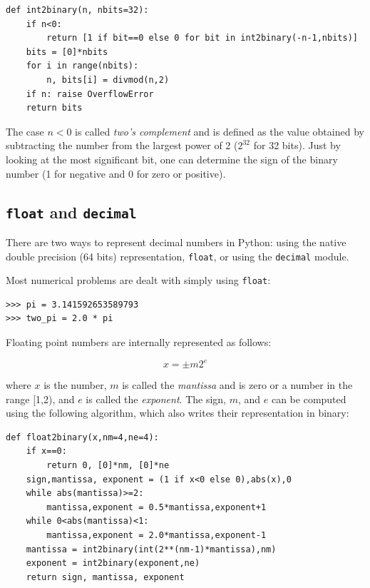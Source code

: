 \documentclass[justified,sixbynine]{tufte-book}
\def\ft{\small\tt}
\theoremstyle{plain}%
\theoremstyle{definition}
\theoremstyle{remark}
\begin{document}
\begin{fullwidth}
\begin{lstlisting}
def int2binary(n, nbits=32):
    if n<0:
        return [1 if bit==0 else 0 for bit in int2binary(-n-1,nbits)]
    bits = [0]*nbits
    for i in range(nbits):
        n, bits[i] = divmod(n,2)
    if n: raise OverflowError
    return bits
\end{lstlisting}


The case $n<0$ is called {\it two's complement} and is defined as the value obtained by subtracting the number from the largest power of 2 ($2^{32}$ for 32 bits). Just by looking at the most significant bit, one can determine the sign of the binary number (1 for negative and 0 for zero or positive).

\goodbreak\subsection{{\ft float} and {\ft decimal}}


There are two ways to represent decimal numbers in Python: using the native double precision (64 bits) representation, {\ft float}, or using the {\ft decimal} module.

Most numerical problems are dealt with simply using {\ft float}:

\begin{lstlisting}
>>> pi = 3.141592653589793
>>> two_pi = 2.0 * pi
\end{lstlisting}

Floating point numbers are internally represented as follows:

\begin{equation}
x = \pm m 2^e
\end{equation}

where $x$ is the number, $m$ is called the {\it mantissa} and is zero or a number in the range [1,2), and $e$ is called the {\it exponent}. The sign, $m$, and $e$ can be computed using the following algorithm, which also writes their representation in binary:

\begin{lstlisting}
def float2binary(x,nm=4,ne=4):
    if x==0:
        return 0, [0]*nm, [0]*ne
    sign,mantissa, exponent = (1 if x<0 else 0),abs(x),0
    while abs(mantissa)>=2:
        mantissa,exponent = 0.5*mantissa,exponent+1
    while 0<abs(mantissa)<1:
        mantissa,exponent = 2.0*mantissa,exponent-1
    mantissa = int2binary(int(2**(nm-1)*mantissa),nm)
    exponent = int2binary(exponent,ne)
    return sign, mantissa, exponent
\end{lstlisting}


\end{fullwidth}
\end{document}
